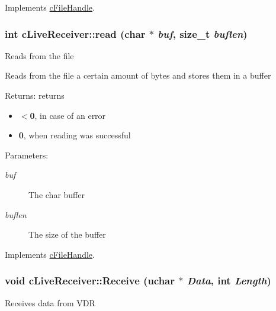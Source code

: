 Implements \hyperlink{classcFileHandle_cdf4f4d07382de675b498d85544ea1b6}{cFileHandle}.\hypertarget{classcLiveReceiver_4a19e1fd4e1d043fb091bfb01a9cbf08}{
\subsubsection[{read}]{\setlength{\rightskip}{0pt plus 5cm}int cLiveReceiver::read (char $\ast$ {\em buf}, \/  size\_\-t {\em buflen})}}
\label{classcLiveReceiver_4a19e1fd4e1d043fb091bfb01a9cbf08}


Reads from the file

Reads from the file a certain amount of bytes and stores them in a buffer

\begin{Desc}
\item[Returns:]returns\begin{itemize}
\item {\bf $<$0}, in case of an error\item {\bf 0}, when reading was successful\end{itemize}
\end{Desc}
\begin{Desc}
\item[Parameters:]
\begin{description}
\item[{\em buf}]The char buffer \item[{\em buflen}]The size of the buffer \end{description}
\end{Desc}
 

Implements \hyperlink{classcFileHandle_458f25a4c7f62d528cffc84e66d38e7d}{cFileHandle}.\hypertarget{classcLiveReceiver_c8bc191994b0acd3fa2d23b26f996f8a}{
\subsubsection[{Receive}]{\setlength{\rightskip}{0pt plus 5cm}void cLiveReceiver::Receive (uchar $\ast$ {\em Data}, \/  int {\em Length})}}
\label{classcLiveReceiver_c8bc191994b0acd3fa2d23b26f996f8a}


Receives data from VDR

